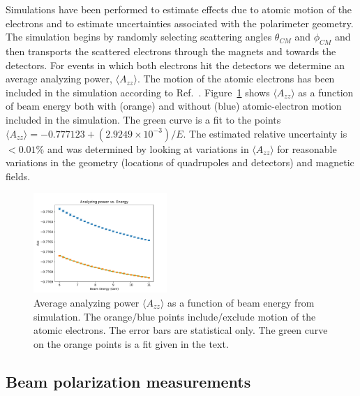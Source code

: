 Simulations have been performed to estimate effects due to atomic motion of the electrons and to estimate uncertainties associated with 
the polarimeter geometry. The simulation begins by randomly selecting scattering angles $\theta_{CM}$ and $\phi_{CM}$ and then transports
the scattered electrons through the magnets and towards the detectors. For events in which both electrons hit the detectors we determine an 
average analyzing power, $\langle A_{zz}\rangle$. The motion of the atomic electrons has been included in the simulation according to
Ref.~\cite{levchuk94}. Figure~\ref{fig-Azz} shows $\langle A_{zz}\rangle$ as a function of beam energy both with (orange) and without 
(blue) atomic-electron motion included in the simulation. The green curve is a fit to the points 
$\langle A_{zz}\rangle= -0.777123+(2.9249\times 10^{-3})/E$. 
The estimated relative uncertainty is $<0.01$\% and was determined by looking at variations in $\langle A_{zz}\rangle$ for reasonable 
variations in the geometry (locations of quadrupoles and detectors) and magnetic fields.
\begin{figure}[ht]
 \begin{center}
  \includegraphics[width=0.45\textwidth]{Azz.pdf}
 \end{center}
	\caption{Average analyzing power $\langle A_{zz}\rangle$ as a function of beam energy from simulation. The orange/blue points 
	include/exclude motion of the atomic electrons. The error bars are statistical only. The green curve on the orange points is a fit 
	given in the text.}
 \label{fig-Azz}
\end{figure}




\subsection{Beam polarization measurements}
\label{sec-SpinDance}

